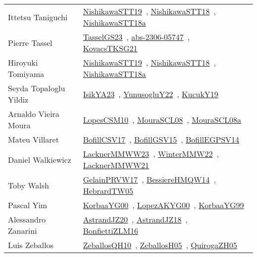 {\begin{longtable}{p{4cm}p{20cm}}
Ittetsu Taniguchi & \href{works/NishikawaSTT19.pdf}{NishikawaSTT19}~\cite{NishikawaSTT19}, \href{works/NishikawaSTT18.pdf}{NishikawaSTT18}~\cite{NishikawaSTT18}, \href{works/NishikawaSTT18a.pdf}{NishikawaSTT18a}~\cite{NishikawaSTT18a}\\
Pierre Tassel & \href{works/TasselGS23.pdf}{TasselGS23}~\cite{TasselGS23}, \href{works/abs-2306-05747.pdf}{abs-2306-05747}~\cite{abs-2306-05747}, \href{works/KovacsTKSG21.pdf}{KovacsTKSG21}~\cite{KovacsTKSG21}\\
Hiroyuki Tomiyama & \href{works/NishikawaSTT19.pdf}{NishikawaSTT19}~\cite{NishikawaSTT19}, \href{works/NishikawaSTT18.pdf}{NishikawaSTT18}~\cite{NishikawaSTT18}, \href{works/NishikawaSTT18a.pdf}{NishikawaSTT18a}~\cite{NishikawaSTT18a}\\
Seyda Topaloglu Yildiz & \href{works/IsikYA23.pdf}{IsikYA23}~\cite{IsikYA23}, \href{works/YunusogluY22.pdf}{YunusogluY22}~\cite{YunusogluY22}, \href{works/KucukY19.pdf}{KucukY19}~\cite{KucukY19}\\
Arnaldo Vieira Moura & \href{works/LopesCSM10.pdf}{LopesCSM10}~\cite{LopesCSM10}, \href{works/MouraSCL08.pdf}{MouraSCL08}~\cite{MouraSCL08}, \href{works/MouraSCL08a.pdf}{MouraSCL08a}~\cite{MouraSCL08a}\\
Mateu Villaret & \href{works/BofillCSV17.pdf}{BofillCSV17}~\cite{BofillCSV17}, \href{works/BofillGSV15.pdf}{BofillGSV15}~\cite{BofillGSV15}, \href{works/BofillEGPSV14.pdf}{BofillEGPSV14}~\cite{BofillEGPSV14}\\
Daniel Walkiewicz & \href{works/LacknerMMWW23.pdf}{LacknerMMWW23}~\cite{LacknerMMWW23}, \href{works/WinterMMW22.pdf}{WinterMMW22}~\cite{WinterMMW22}, \href{works/LacknerMMWW21.pdf}{LacknerMMWW21}~\cite{LacknerMMWW21}\\
Toby Walsh & \href{works/GelainPRVW17.pdf}{GelainPRVW17}~\cite{GelainPRVW17}, \href{works/BessiereHMQW14.pdf}{BessiereHMQW14}~\cite{BessiereHMQW14}, \href{works/HebrardTW05.pdf}{HebrardTW05}~\cite{HebrardTW05}\\
Pascal Yim & \href{works/KorbaaYG00.pdf}{KorbaaYG00}~\cite{KorbaaYG00}, \href{works/LopezAKYG00.pdf}{LopezAKYG00}~\cite{LopezAKYG00}, \href{works/KorbaaYG99.pdf}{KorbaaYG99}~\cite{KorbaaYG99}\\
Alessandro Zanarini & \href{works/AstrandJZ20.pdf}{AstrandJZ20}~\cite{AstrandJZ20}, \href{works/AstrandJZ18.pdf}{AstrandJZ18}~\cite{AstrandJZ18}, \href{works/BonfiettiZLM16.pdf}{BonfiettiZLM16}~\cite{BonfiettiZLM16}\\
Luis Zeballos & \href{works/ZeballosQH10.pdf}{ZeballosQH10}~\cite{ZeballosQH10}, \href{works/ZeballosH05.pdf}{ZeballosH05}~\cite{ZeballosH05}, \href{works/QuirogaZH05.pdf}{QuirogaZH05}~\cite{QuirogaZH05}\\

\end{longtable}}
